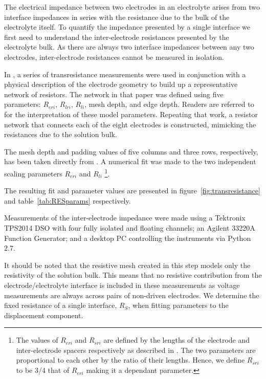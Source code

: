 \documentclass[journal, a4paper]{IEEEtran}
\begin{document}
The electrical impedance between two electrodes in an electrolyte arises from two interface impedances in series with the resistance due to the bulk of the electrolyte itself. To quantify the impedance presented by a single interface we first need to understand the inter-electrode resistances presented by the electrolyte bulk. As there are always two interface impedances between any two electrodes, inter-electrode resistances cannot be measured in isolation.

In \cite{ScottSingle2013}, a series of transresistance measurements were used in conjunction with a physical description of the electrode geometry to build up a representative network of resistors. The network in that paper was defined using five parameters: $R_{eri}$, $R_{lri}$, $R_{li}$, mesh depth, and edge depth. Readers are referred to \cite{ScottSingle2013} for the interpretation of these model parameters. Repeating that work, a resistor network that connects each of the eight electrodes is constructed, mimicking the resistances due to the solution bulk.

The mesh depth and padding values of five columns and three rows, respectively, has been taken directly from \cite{ScottSingle2013}.
A numerical fit was made to the two independent scaling parameters $R_{eri}$ and $R_{li}$
\footnote{The values of $R_{eri}$ and $R_{sri}$ are defined by the lengths of the electrode and inter-electrode spacers respectively as described in \cite{ScottSingle2013}. The two parameters are proportional to each other by the ratio of their lengths. Hence, we define $R_{sri}$ to be 3/4 that of $R_{eri}$ making it a dependant parameter.}.

The resulting fit and parameter values are presented in figure~\ref{fig:transresistance} and table~\ref{tab:RESparams} respectively.

Measurements of the inter-electrode impedance were made using a Tektronix TPS2014 DSO with four fully isolated and floating channels; an Agilent 33220A Function Generator; and a desktop PC controlling the instruments via Python 2.7.


It should be noted that the resistive mesh created in this step models only the resistivity of the solution bulk. This means that no resistive contribution from the electrode/electrolyte interface is included in these measurements as voltage measurements are always across pairs of non-driven electrodes. We determine the fixed resistance of a single interface, $R_{S}$, when fitting parameters to the displacement component.
\end{document}
